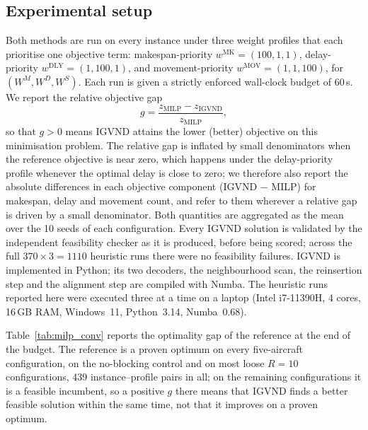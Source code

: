 \subsection{Experimental setup}
\label{sec:exp_setup}

Both methods are run on every instance under three weight profiles that
each prioritise one objective term: makespan-priority
$w^{\mathrm{MK}} = (100, 1, 1)$, delay-priority
$w^{\mathrm{DLY}} = (1, 100, 1)$, and movement-priority
$w^{\mathrm{MOV}} = (1, 1, 100)$, for $(W^M, W^D, W^S)$.  Each run is given
a strictly enforced wall-clock budget of 60\,s.  We report the relative
objective gap
\[
  g = \frac{z_{\mathrm{MILP}} - z_{\mathrm{IGVND}}}{z_{\mathrm{MILP}}},
\]
so that $g > 0$ means IGVND attains the lower (better) objective on this
minimisation problem.  The relative gap is inflated by small denominators
when the reference objective is near zero, which happens under the
delay-priority profile whenever the optimal delay is close to zero; we
therefore also report the absolute differences in each objective
component (IGVND $-$ MILP) for makespan, delay and movement count, and
refer to them wherever a relative gap is driven by a small denominator.
Both quantities are aggregated as the mean over the 10 seeds of each
configuration.  Every IGVND solution is validated by the independent
feasibility checker as it is produced, before being scored; across the
full $370 \times 3 = 1110$ heuristic runs there were no feasibility
failures.  IGVND is implemented in Python; its two decoders, the
neighbourhood scan, the reinsertion step and the alignment step are
compiled with Numba.  The heuristic runs reported here were executed three at a
time on a laptop (Intel i7-11390H, 4 cores, 16\,GB RAM, Windows~11,
Python~3.14, Numba~0.68).

Table~\ref{tab:milp_conv} reports the optimality gap of the reference at
the end of the budget.  The reference is a proven optimum on every
five-aircraft configuration, on the no-blocking control and on most
loose $R{=}10$ configurations, 439 instance--profile pairs in all; on
the remaining configurations it is a feasible incumbent, so a positive
$g$ there means that IGVND finds a better feasible solution within the
same time, not that it improves on a proven optimum.



